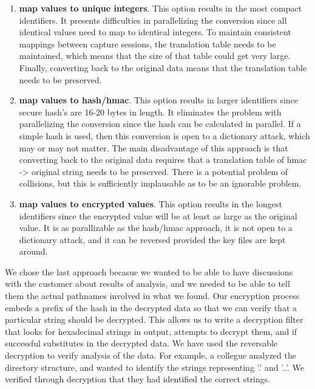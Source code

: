 \begin{enumerate}

\item {\bf map values to unique integers}.  This option results in the
most compact identifiers.  It presents difficulties in parallelizing
the conversion since all identical values need to map to identical
integers.  To maintain consistent mappings between capture sessions,
the translation table needs to be maintained, which means that the
size of that table could get very large.  Finally, converting back to
the original data means that the translation table needs to be preserved.

\item {\bf map values to hash/hmac}.  This option results in larger
identifiers since secure hash's are 16-20 bytes in length.  It
eliminates the problem with parallelizing the conversion since the
hash can be calculated in parallel.  If a simple hash is used, then
this conversion is open to a dictionary attack, which may or may not
matter.  The main disadvantage of this approach is that converting
back to the original data requires that a translation table of hmac ->
original string needs to be preserved.  There is a potential problem
of collisions, but this is sufficiently implausable as to be an
ignorable problem.

\item {\bf map values to encrypted values}.  This option results in
the longest identifiers since the encrypted value will be at least as
large as the original value.  It is as parallizable as the hash/hmac
approach, it is not open to a dictionary attack, and it can be
reversed provided the key files are kept around.

\end{enumerate}

We chose the last approach becasue we wanted to be able to have
discussions with the customer about results of analysis, and we needed
to be able to tell them the actual pathnames involved in what we
found.  Our encryption process embeds a prefix of the hash in the
decrypted data so that we can verify that a particular string should
be decrypted.  This allows us to write a decryption filter that looks
for hexadecimal strings in output, attempts to decrypt them, and if
successful substitutes in the decrypted data.  We have used the
reversable decryption to verify analysis of the data.  For example, a
collegue analyzed the directory structure, and wanted to identify the
strings representing '.' and '..'.  We verified through decryption
that they had identified the correct strings.

